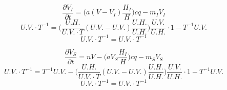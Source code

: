 \documentclass[
	12pt,				%
	openright,			%
	twoside,			%
	a4paper,			%
	english,			%
	french,				%
	spanish,			%
	brazil				%
	]{abntex2}
\begin{document}
$$ \frac{\partial V_I}{\partial t}= \Big(a(V-V_I)\frac{H_I}{H}\Big)cq-m_I V_I$$
$$U.V.\cdot T^{-1}=\Big(\frac{U.H.}{U.V.\cdot T} (U.V.-U.V.)\frac{U.H.}{U.H.}\Big)\frac{U.V.}{U.H.}\cdot 1 - T^{-1}U.V.$$
$$U.V.\cdot T^{-1}=U.V.\cdot T^{-1}$$


$$ \frac{\partial V_S}{\partial t}= nV-\Big(aV_S\frac{H_I}{H}\Big)cq-m_S V_S$$
$$U.V.\cdot T^{-1} = T^{-1}U.V. -  \Big(\frac{U.H.}{U.V.\cdot T} (U.V.-U.V.)\frac{U.H.}{U.H.}\Big)\frac{U.V.}{U.H.}\cdot 1 - T^{-1}U.V.$$
$$U.V.\cdot T^{-1}=U.V.\cdot T^{-1}$$


\end{document}

